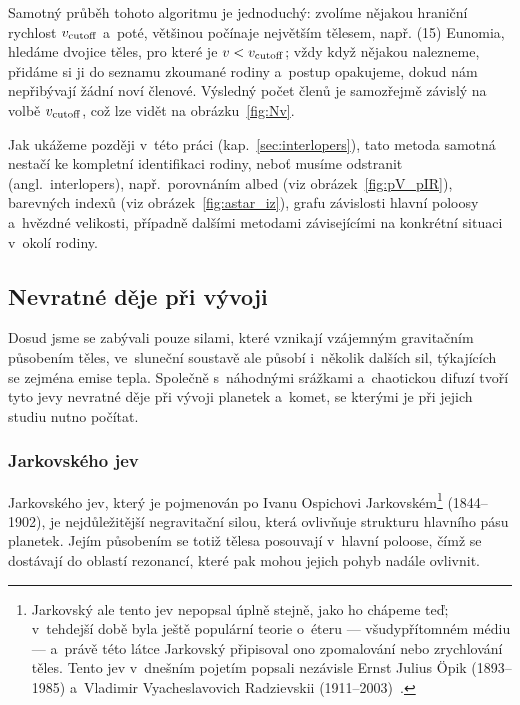 \documentclass[A4paper, 12pt, oneside, openany]{book}
\begin{document}
Samotný průběh tohoto algoritmu je jednoduchý: zvolíme nějakou hraniční rychlost $v_{\rm cutoff}$ a~poté, většinou počínaje největším tělesem, např. (15) Eunomia, hledáme dvojice těles, pro které je $v<v_{\rm cutoff}$; vždy když nějakou nalezneme, přidáme si ji do seznamu zkoumané rodiny a~postup opakujeme, dokud nám nepřibývají žádní noví členové. Výsledný počet členů je samozřejmě závislý na volbě $v_{\rm cutoff}$, což lze vidět na obrázku~\ref{fig:Nv}.

Jak ukážeme později v~této práci (kap.~\ref{sec:interlopers}), tato metoda samotná nestačí ke kompletní identifikaci rodiny, neboť musíme odstranit  (angl.\ interlopers), např.\ porovnáním albed (viz obrázek~\ref{fig:pV_pIR}), barevných indexů (viz obrázek~\ref{fig:astar_iz}), grafu závislosti hlavní poloosy a~hvězdné velikosti, případně dalšími metodami závisejícími na konkrétní situaci v~okolí rodiny.

\subsection{Nevratné děje při vývoji}

Dosud jsme se zabývali pouze silami, které vznikají vzájemným gravitačním působením těles, ve~sluneční soustavě ale působí i~několik dalších sil, týkajících se zejména emise tepla. Společně s~náhodnými srážkami a~chaotickou difuzí tvoří tyto jevy nevratné děje při vývoji planetek a~komet, se kterými je při jejich studiu nutno počítat.

\subsubsection{Jarkovského jev} \label{sec:jarko}
Jarkovského jev, který je pojmenován po Ivanu Ospichovi Jarkovském\footnote{Jarkovský ale tento jev nepopsal úplně stejně, jako ho chápeme teď; v~tehdejší době byla ještě populární teorie o~éteru --- všudypřítomném médiu --- a~právě této látce Jarkovský připisoval ono zpomalování nebo zrychlování těles. Tento jev v~dnešním pojetím popsali nezávisle Ernst Julius Öpik (1893--1985) a~Vladimir Vyacheslavovich Radzievskii (1911--2003)~\cite{brozphd}.}  (1844--1902), je nejdůležitější negravitační silou, která ovlivňuje strukturu hlavního pásu planetek. Jejím působením se totiž tělesa posouvají v~hlavní poloose, čímž se dostávají do oblastí rezonancí, které pak mohou jejich pohyb nadále ovlivnit.
\end{document}
